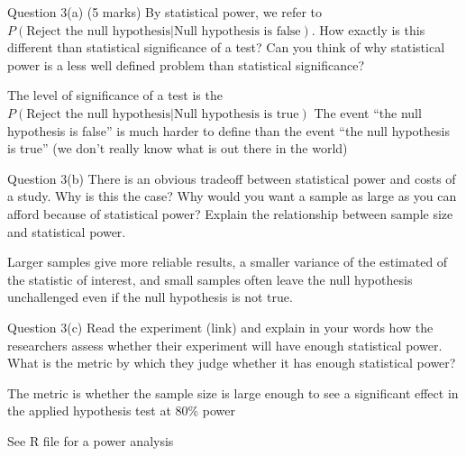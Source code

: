 \documentclass[xcolor=table,dvipsnames]{beamer}
\begin{document}
\begin{frame}{Question 3(a)}
(5 marks) By statistical power, we refer to $P(\text{Reject the null hypothesis}|\text{Null hypothesis is false})$. 
How exactly is this different than statistical significance of a test? \pause Can you think of why statistical power is a less well defined problem than statistical significance? \pause

The level of significance of a test is the $P(\text{Reject the null hypothesis}|\text{Null hypothesis is true})$ \pause The event ``the null hypothesis is false'' is much harder to define than the event ``the null hypothesis is true'' (we don't really know what is out there in the world)
\end{frame}

\begin{frame}{Question 3(b)}
There is an obvious tradeoff between statistical power and costs of a study. Why is this the case? Why would you want a sample as large as you can afford because of statistical power? Explain the relationship between sample size and statistical power. \pause

Larger samples give more reliable results, a smaller variance of the estimated of the statistic of interest, and small samples often leave the null hypothesis unchallenged even if the null hypothesis is not true.
\end{frame}

\begin{frame}{Question 3(c)}
Read the experiment (link) and explain in your words how the researchers assess whether their experiment will have enough statistical power. What is the metric by which they judge whether it has enough statistical power? \pause

The metric is whether the sample size is large enough to see a significant effect in the applied hypothesis test at 80\% power \pause

See R file for a power analysis
\end{frame}


\end{document}
